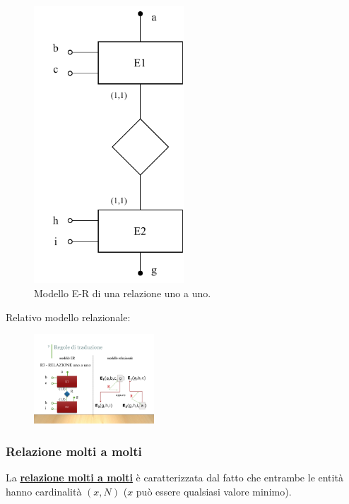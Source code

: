 \documentclass[a4paper]{article}
\begin{document}
	\begin{figure}[!htp]
		\centering
		\includegraphics[width=0.5\textwidth]{img/relazionale_uno_a_uno.pdf}
		\caption{Modello E-R di una relazione uno a uno.}
	\end{figure}
	
	\noindent
	Relativo modello relazionale:
	
	\begin{figure}[!htp]
		\centering
		\includegraphics[width=0.4\textwidth]{img/relazionale_uno_a_uno2.pdf}
	\end{figure}

	\newpage
	
	\subsubsection{Relazione molti a molti}
	
	La \textcolor{Red3}{\textbf{\underline{relazione molti a molti}}} è caratterizzata dal fatto che entrambe le entità hanno cardinalità $\left(x,N\right)$ ($x$ può essere qualsiasi valore minimo).
	
\end{document}
